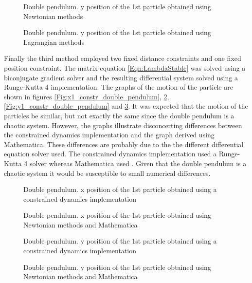 \begin{figure}
	\begin{center}
	\end{center}
    \caption{\label{Fig:y1_newtonian}Double pendulum. y position of the 1st particle obtained using Newtonian methods}
	\begin{center}
	\end{center}
    \caption{\label{Fig:y1_lagrangian}Double pendulum. y position of the 1st particle obtained using Lagrangian methods}
\end{figure}

Finally the third method employed two fixed distance constraints and one fixed
position constraint. The matrix equation \ref{Eqn:LambdaStable} was solved using
a biconjugate gradient solver \cite{NumRecipes} and the resulting differential
system solved using a Runge-Kutta 4 implementation. The graphs of the motion of
the particle are shown in figures \ref{Fig:x1_constr_double_pendulum},
\ref{Fig:x1_double_pendulum}, \ref{Fig:y1_constr_double_pendulum} and
\ref{Fig:y1_double_pendulum}.  It was expected that the motion of the particles
be similar, but not exactly the same since the double pendulum is a chaotic
system. However, the graphs illustrate disconcerting differences between the
constrained dynamics implementation and the graph derived using Mathematica.
These differences are probably due to the the different differential equation
solver used. The constrained dynamics implementation used a Runge-Kutta 4
solver whereas Mathematica used . Given that the double
pendulum is a chaotic system it would be susceptible to small numerical
differences.

\begin{figure}
	\begin{center}
	\end{center}
    \caption{\label{Fig:x1_constr_double_pendulum}Double pendulum. x position of the 1st particle
    obtained using a constrained dynamics implementation}
	\begin{center}
	\end{center}
    \caption{\label{Fig:x1_double_pendulum}Double pendulum. x position of the 1st particle
    obtained using Newtonian methods and Mathematica}
\end{figure}

\begin{figure}
	\begin{center}
	\end{center}
    \caption{\label{Fig:y1_constr_double_pendulum}Double pendulum. y position of the 1st particle
    obtained using a constrained dynamics implementation}
	\begin{center}
	\end{center}
    \caption{\label{Fig:y1_double_pendulum}Double pendulum. y position of the 1st particle
    obtained using Newtonian methods and Mathematica}
\end{figure}

